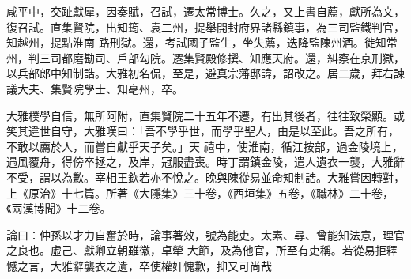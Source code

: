 \begin{pinyinscope}
 咸平中，交趾獻犀，因奏賦，召試，遷太常博士。久之，又上書自薦，獻所為文，復召試。直集賢院，出知筠、袁二州，提舉開封府界諸縣鎮事，為三司監鐵判官，知越州，提點淮南
 路刑獄。還，考試國子監生，坐失薦，迭降監陳州酒。徙知常州，判三司都磨勘司、戶部勾院。遷集賢殿修撰、知應天府。還，糾察在京刑獄，以兵部郎中知制誥。大雅初名侃，至是，避真宗藩邸諱，詔改之。居二歲，拜右諫議大夫、集賢院學士、知亳州，卒。



 大雅樸學自信，無所阿附，直集賢院二十五年不遷，有出其後者，往往致榮顯。或笑其違世自守，大雅嘆曰：「吾不學乎世，而學乎聖人，由是以至此。吾之所有，不敢以薦於人，而嘗自獻乎天子矣。」天
 禧中，使淮南，循江按部，過金陵境上，遇風覆舟，得傍卒拯之，及岸，冠服盡喪。時丁謂鎮金陵，遣人遺衣一襲，大雅辭不受，謂以為歉。宰相王欽若亦不悅之。晚與陳從易並命知制誥。大雅嘗因轉對，上《原治》十七篇。所著《大隱集》三十卷，《西垣集》五卷，《職林》二十卷，《兩漢博聞》十二卷。



 論曰：仲孫以才力自奮於時，論事著效，號為能吏。太素、尋、曾能知法意，理官之良也。虛己、獻卿立朝雖徽，卓犖
 大節，及為他官，所至有吏稱。若從易拒釋憾之言，大雅辭襲衣之遺，卒使權奸愧歉，抑又可尚哉



\end{pinyinscope}